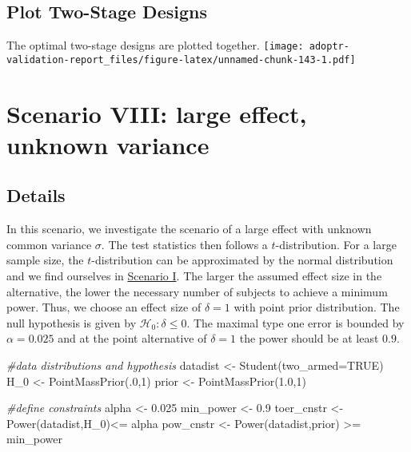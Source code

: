 \documentclass[
]{book}
\newenvironment{Shaded}{\begin{snugshade}}{\end{snugshade}}
\newcommand{\AttributeTok}[1]{\textcolor[rgb]{0.77,0.63,0.00}{#1}}
\newcommand{\CommentTok}[1]{\textcolor[rgb]{0.56,0.35,0.01}{\textit{#1}}}
\newcommand{\ConstantTok}[1]{\textcolor[rgb]{0.00,0.00,0.00}{#1}}
\newcommand{\DecValTok}[1]{\textcolor[rgb]{0.00,0.00,0.81}{#1}}
\newcommand{\FloatTok}[1]{\textcolor[rgb]{0.00,0.00,0.81}{#1}}
\newcommand{\FunctionTok}[1]{\textcolor[rgb]{0.00,0.00,0.00}{#1}}
\newcommand{\NormalTok}[1]{#1}
\newcommand{\OtherTok}[1]{\textcolor[rgb]{0.56,0.35,0.01}{#1}}
\newcommand{\SpecialCharTok}[1]{\textcolor[rgb]{0.00,0.00,0.00}{#1}}
\begin{document}
\hypertarget{plot-two-stage-designs-3}{%
\section{Plot Two-Stage Designs}\label{plot-two-stage-designs-3}}

The optimal two-stage designs are plotted together.
\texttt{[image: adoptr-validation-report\_files/figure-latex/unnamed-chunk-143-1.pdf]}

\hypertarget{scenarioVIII}{%
\chapter{Scenario VIII: large effect, unknown variance}\label{scenarioVIII}}

\hypertarget{details-7}{%
\section{Details}\label{details-7}}

In this scenario, we investigate the scenario of a large effect with unknown common variance \(\sigma\). The test statistics then follows a \(t\)-distribution. For a large sample size, the \(t\)-distribution can be approximated by the normal distribution and we find ourselves in \protect\hyperlink{scenarioI}{Scenario I}.
The larger the assumed effect size in the alternative, the lower the necessary number of subjects to achieve a minimum power. Thus, we choose an effect size of \(\delta=1\) with point prior distribution. The null hypothesis is given by \(\mathcal{H}_0: \delta \leq 0\). The maximal type one error is bounded by \(\alpha=0.025\) and at the point alternative of \(\delta=1\) the power should be at least \(0.9\).

\begin{Shaded}
\begin{Highlighting}[]
\CommentTok{\#data distributions and hypothesis}
\NormalTok{datadist }\OtherTok{\textless{}{-}} \FunctionTok{Student}\NormalTok{(}\AttributeTok{two\_armed=}\ConstantTok{TRUE}\NormalTok{)}
\NormalTok{H\_0 }\OtherTok{\textless{}{-}} \FunctionTok{PointMassPrior}\NormalTok{(.}\DecValTok{0}\NormalTok{,}\DecValTok{1}\NormalTok{)}
\NormalTok{prior }\OtherTok{\textless{}{-}} \FunctionTok{PointMassPrior}\NormalTok{(}\FloatTok{1.0}\NormalTok{,}\DecValTok{1}\NormalTok{)}

\CommentTok{\#define constraints}
\NormalTok{alpha }\OtherTok{\textless{}{-}} \FloatTok{0.025}
\NormalTok{min\_power }\OtherTok{\textless{}{-}} \FloatTok{0.9}
\NormalTok{toer\_cnstr }\OtherTok{\textless{}{-}} \FunctionTok{Power}\NormalTok{(datadist,H\_0)}\SpecialCharTok{\textless{}=}\NormalTok{ alpha}
\NormalTok{pow\_cnstr }\OtherTok{\textless{}{-}} \FunctionTok{Power}\NormalTok{(datadist,prior) }\SpecialCharTok{\textgreater{}=}\NormalTok{ min\_power}
\end{Highlighting}
\end{Shaded}
\end{document}
